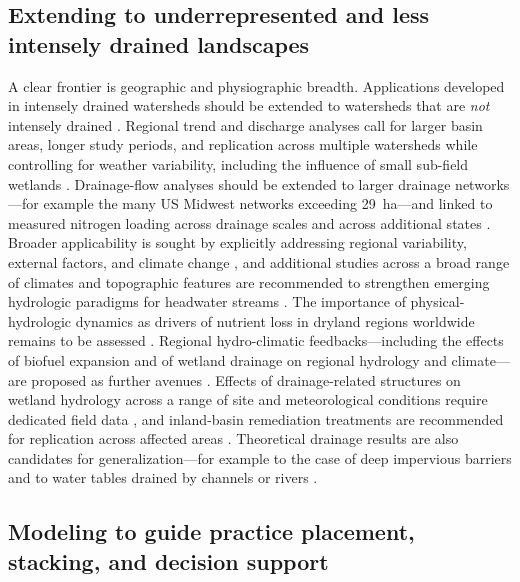 \subsection{Extending to underrepresented and less intensely drained landscapes}

A clear frontier is geographic and physiographic breadth. Applications developed in intensely drained watersheds should be extended to watersheds that are \emph{not} intensely drained \parencite{Kujawa2020}. Regional trend and discharge analyses call for larger basin areas, longer study periods, and replication across multiple watersheds while controlling for weather variability, including the influence of small sub-field wetlands \parencite{Yang2017}. Drainage-flow analyses should be extended to larger drainage networks---for example the many US Midwest networks exceeding 29~ha---and linked to measured nitrogen loading across drainage scales and across additional states \parencite{Christianson2025}. Broader applicability is sought by explicitly addressing regional variability, external factors, and climate change \parencite{Naderi2025}, and additional studies across a broad range of climates and topographic features are recommended to strengthen emerging hydrologic paradigms for headwater streams \parencite{King2009}. The importance of physical-hydrologic dynamics as drivers of nutrient loss in dryland regions worldwide remains to be assessed \parencite{Kelley2017}. Regional hydro-climatic feedbacks---including the effects of biofuel expansion and of wetland drainage on regional hydrology and climate---are proposed as further avenues \parencite{Kumar2009}. Effects of drainage-related structures on wetland hydrology across a range of site and meteorological conditions require dedicated field data \parencite{Tangen2018}, and inland-basin remediation treatments are recommended for replication across affected areas \parencite{Kumar2006}. Theoretical drainage results are also candidates for generalization---for example to the case of deep impervious barriers and to water tables drained by channels or rivers \parencite{Zimmer2023}.

\subsection{Modeling to guide practice placement, stacking, and decision support}

